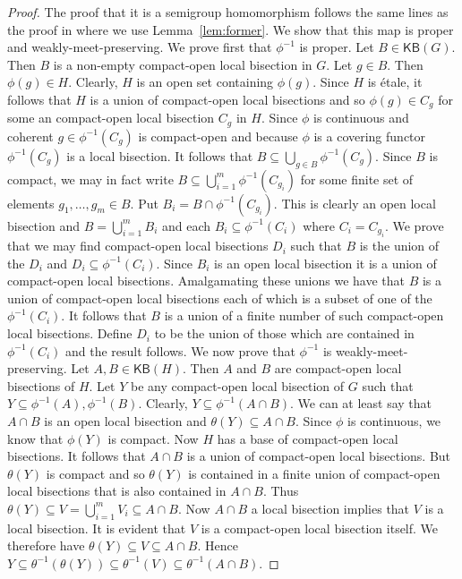 \documentclass[a4paper]{amsart}
\begin{document}
\begin{proof}
The proof that it is a semigroup homomorphism follows the same lines as the proof
in \cite[Proposition 2.17]{Lawson3} where we use Lemma~\ref{lem:former}.
We show that this map is proper and weakly-meet-preserving.
We prove first that $\phi^{-1}$ is proper. 
Let $B \in \mathsf{KB}(G)$.
Then $B$ is a non-empty compact-open local bisection in $G$.
Let $g \in B$.
Then $\phi (g) \in H$.
Clearly, $H$ is an open set containing $\phi (g)$.
Since $H$ is \'etale, it follows that $H$ is a union of compact-open local bisections 
and so $\phi (g) \in C_{g}$ for some an compact-open local bisection $C_{g}$ in $H$.
Since $\phi$ is continuous and coherent $g \in \phi^{-1}(C_{g})$ is compact-open 
and because $\phi$ is a covering functor $\phi^{-1} (C_{g})$ is a local bisection.
It follows that $B \subseteq \bigcup_{g \in B} \phi^{-1}(C_{g})$.
Since $B$ is compact, we may in fact write
$B \subseteq \bigcup_{i=1}^{m} \phi^{-1}(C_{g_{i}})$
for some finite set of elements $g_{1}, \ldots, g_{m} \in B$.
Put $B_{i} = B \cap \phi^{-1}(C_{g_{i}})$.
This is clearly an open local bisection and $B = \bigcup_{i=1}^{m} B_{i}$ 
and each $B_{i} \subseteq \phi^{-1}(C_{i})$ where $C_{i} = C_{g_{i}}$.
We prove that we may find compact-open local bisections $D_{i}$ such that
$B$ is the union of the $D_{i}$ and $D_{i} \subseteq \phi^{-1}(C_{i})$.
Since $B_{i}$ is an open local bisection it is a union of compact-open local bisections.
Amalgamating these unions we have that $B$ is a union of compact-open local bisections
each of which is a subset of one of the $\phi^{-1}(C_{i})$.
It follows that $B$ is a union of a finite number of such compact-open local bisections.
Define $D_{i}$ to be the union of those which are contained in $\phi^{-1}(C_{i})$ and the result follows.
We now prove that $\phi^{-1}$ is weakly-meet-preserving.
Let $A,B \in \mathsf{KB}(H)$.
Then $A$ and $B$ are compact-open local bisections of $H$.
Let $Y$ be any compact-open local bisection of $G$ such that $Y \subseteq \phi^{-1}(A), \phi^{-1}(B)$.
Clearly, $Y \subseteq \phi^{-1}(A \cap B)$.
We can at least say that $A \cap B$ is an open local bisection
and 
$\theta (Y) \subseteq A \cap B$.
Since $\phi$ is continuous, we know that $\phi (Y)$ is compact.
Now $H$ has a base of compact-open local bisections.
It follows that $A \cap B$ is a union of compact-open local bisections.
But $\theta (Y)$ is compact and so $\theta (Y)$ is contained in a finite union of compact-open local
bisections that is also contained in $A \cap B$.
Thus $\theta (Y) \subseteq V = \bigcup_{i=1}^{m} V_{i} \subseteq A \cap B$.
Now $A \cap B$ a local bisection implies that $V$ is a local bisection.
It is evident that $V$ is a compact-open local bisection itself.
We therefore have $\theta (Y) \subseteq V \subseteq A \cap B$.
Hence $Y \subseteq \theta^{-1}(\theta (Y)) \subseteq \theta^{-1}(V) \subseteq \theta^{-1}(A \cap B)$. 


\end{proof}
\end{document}
